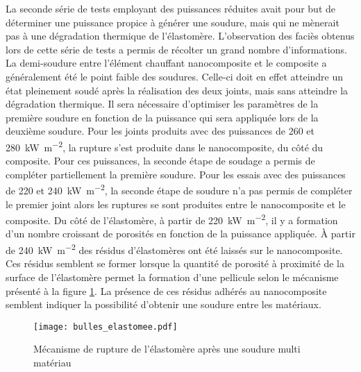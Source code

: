 La seconde série de tests employant des puissances réduites avait pour but de déterminer une puissance propice à générer une soudure, mais qui ne mènerait pas à une dégradation thermique de l'élastomère. 
L'observation des faciès obtenus lors de cette série de tests a permis de récolter un grand nombre d'informations. 
La demi-soudure entre l'élément chauffant nanocomposite et le composite a généralement été le point faible des soudures. 
Celle-ci doit en effet atteindre un état pleinement soudé après la réalisation des deux joints, mais sans atteindre la dégradation thermique. 
Il sera nécessaire d'optimiser les paramètres de la première soudure en fonction de la puissance qui sera appliquée lors de la deuxième soudure. 
Pour les joints produits avec des puissances de 260 et \SI{280}{\kilo\watt\per\square\metre}, la rupture s'est produite dans le nanocomposite, du côté du composite. 
Pour ces puissances, la seconde étape de soudage a permis de compléter partiellement la première soudure. 
Pour les essais avec des puissances de 220 et \SI{240}{\kilo\watt\per\square\metre}, la seconde étape de soudure n'a pas permis de compléter le premier joint alors les ruptures se sont produites entre le nanocomposite et le composite. 
Du côté de l'élastomère, à partir de \SI{220}{\kilo\watt\per\square\metre}, il y a formation d'un nombre croissant de porosités en fonction de la puissance appliquée. 
À partir de \SI{240}{\kilo\watt\per\square\metre} des résidus d'élastomères ont été laissés sur le nanocomposite. 
Ces résidus semblent se former lorsque la quantité de porosité à proximité de la surface de l'élastomère permet la formation d'une pellicule selon le mécanisme présenté à la figure \ref{fig:bulles_elastomere}. 
La présence de ces résidus adhérés au nanocomposite semblent indiquer la possibilité d'obtenir une soudure entre les matériaux. 

\begin{figure}[h]
	\centering
	\texttt{[image: bulles\_elastomee.pdf]}
	\caption{Mécanisme de rupture de l'élastomère après une soudure multi matériau}
	\label{fig:bulles_elastomere}
\end{figure}


